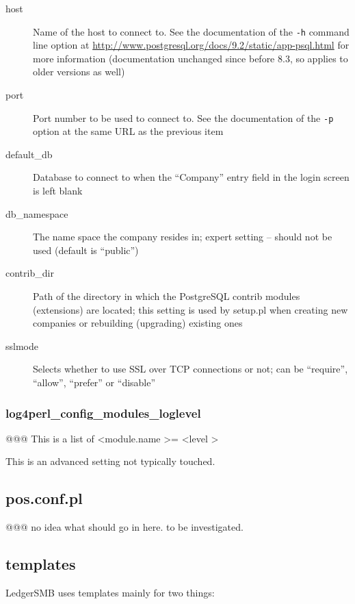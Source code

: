 \begin{description}
\item [host] Name of the host to connect to. See the documentation of the {\tt -h} command line option at 
   \url{http://www.postgresql.org/docs/9.2/static/app-psql.html}
   for more information (documentation unchanged since before 8.3, so applies to older versions as well)
\item [port] Port number to be used to connect to. See the documentation of the {\tt -p} option at the
   same URL as the previous item
\item [default\_db] Database to connect to when the ``Company'' entry field in the login screen is left blank
\item [db\_namespace] The name space the company resides in; expert setting -- should not be used (default is
   ``public'')
\item [contrib\_dir] Path of the directory in which the PostgreSQL contrib modules (extensions) are
   located; this setting is used by setup.pl when creating new companies or rebuilding (upgrading)
   existing ones
\item [sslmode] Selects whether to use \gls{SSL} over TCP connections or not; can be ``require'', ``allow'',
   ``prefer'' or ``disable''
\end{description}

\subsubsection{log4perl\_config\_modules\_loglevel}
\label{subsubsec-global-config-ledgersmb-conf-log4perl}

@@@ This is a list of \textless module.name \textgreater = \textless level \textgreater

This is an advanced setting not typically touched.


\subsection{pos.conf.pl}
\label{subsec-global-config-pos-conf}


@@@ no idea what should go in here. to be investigated.

\subsection{templates}
\label{subsec-global-config-templates}

LedgerSMB uses templates mainly for two things:

